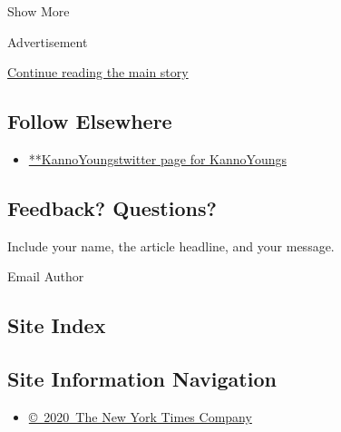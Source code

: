 Show More

Advertisement

\protect\hyperlink{after-mid2}{Continue reading the main story}

\hypertarget{follow-elsewhere}{%
\subsection{Follow Elsewhere}\label{follow-elsewhere}}

\begin{itemize}
\tightlist
\item
  \href{https://twitter.com/KannoYoungs}{**KannoYoungstwitter page for
  KannoYoungs}
\end{itemize}

\hypertarget{feedback-questions}{%
\subsection{Feedback? Questions?}\label{feedback-questions}}

Include your name, the article headline, and your message.

Email Author

\hypertarget{site-index}{%
\subsection{Site Index}\label{site-index}}

\hypertarget{site-information-navigation}{%
\subsection{Site Information
Navigation}\label{site-information-navigation}}

\begin{itemize}
\tightlist
\item
  \href{https://help.nytimes.com/hc/en-us/articles/115014792127-Copyright-notice}{©~2020~The
  New York Times Company}
\end{itemize}

